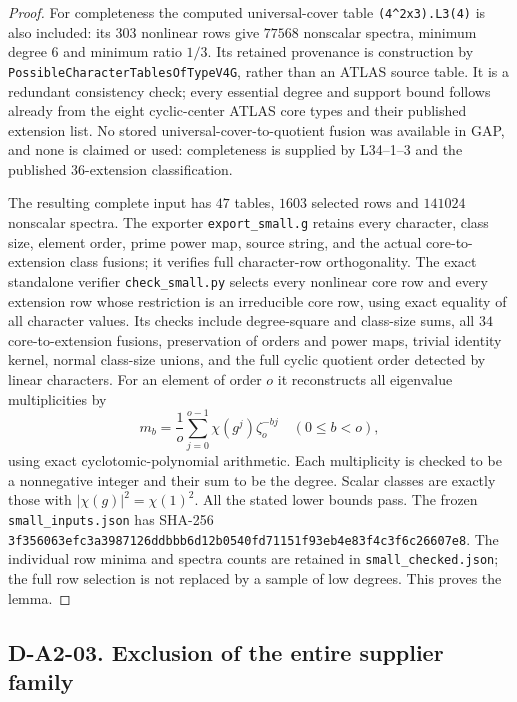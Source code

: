 \begin{proof}
For completeness the computed universal-cover table
\texttt{(4\^{}2x3).L3(4)} is also included: its $303$ nonlinear
rows give $77568$ nonscalar spectra, minimum degree $6$ and
minimum ratio $1/3$.  Its retained provenance is construction by
\texttt{PossibleCharacterTablesOfTypeV4G}, rather than an ATLAS
source table.  It is a redundant consistency check; every essential
degree and support bound follows already from the eight cyclic-center
ATLAS core types and their published extension list.
No stored universal-cover-to-quotient fusion was available in GAP,
and none is claimed or used: completeness is supplied by L34--1--3
and the published $36$-extension classification.

The resulting complete input has $47$ tables, $1603$ selected
rows and $141024$ nonscalar spectra.  The exporter
\texttt{export\_small.g} retains every character, class size,
element order, prime power map, source string, and the actual
core-to-extension class fusions; it verifies full character-row
orthogonality.  The exact standalone verifier
\texttt{check\_small.py} selects every nonlinear core row and
every extension row whose restriction is an irreducible core row,
using exact equality of all character values.  Its checks include
degree-square and class-size sums, all $34$ core-to-extension
fusions, preservation of orders and power maps, trivial identity
kernel, normal class-size unions, and the full cyclic quotient
order detected by linear characters.  For an element of order $o$
it reconstructs all eigenvalue multiplicities by
\[
 m_b=\frac1o\sum_{j=0}^{o-1}\chi(g^j)\zeta_o^{-bj}
       \quad(0\le b<o),                                  \tag{A2.8}
\]
using exact cyclotomic-polynomial arithmetic.  Each multiplicity
is checked to be a nonnegative integer and their sum to be the
degree.  Scalar classes are exactly those with
$|\chi(g)|^2=\chi(1)^2$.  All the stated lower bounds pass.
The frozen \texttt{small\_inputs.json} has SHA-256
\texttt{3f356063efc3a3987126ddbbb6d12b0540fd71151f93eb4e83f4c3f6c26607e8}.
The individual row minima and spectra counts are retained in
\texttt{small\_checked.json}; the full row selection is not
replaced by a sample of low degrees.  This proves the lemma.
\end{proof}

\subsection*{D-A2-03. Exclusion of the entire supplier family}

